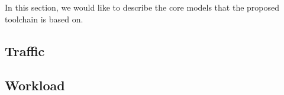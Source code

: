 In this section, we would like to describe the core models that the proposed
toolchain is based on.

\subsection{Traffic}


\subsection{Workload}

